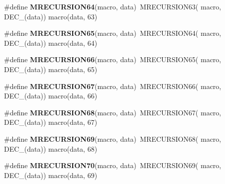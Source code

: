 \begin{DoxyCompactItemize}
\item 
\hypertarget{group__group__sam0__utils__mrecursion_gada0aad0d480e150d9fd5621e3769f397}{}\#define {\bfseries M\+R\+E\+C\+U\+R\+S\+I\+O\+N64}(macro,  data)~M\+R\+E\+C\+U\+R\+S\+I\+O\+N63(  macro, D\+E\+C\+\_\+(data))   macro(data, 63)\label{group__group__sam0__utils__mrecursion_gada0aad0d480e150d9fd5621e3769f397}

\item 
\hypertarget{group__group__sam0__utils__mrecursion_ga559cd98b41f57003d86b982477bad6bb}{}\#define {\bfseries M\+R\+E\+C\+U\+R\+S\+I\+O\+N65}(macro,  data)~M\+R\+E\+C\+U\+R\+S\+I\+O\+N64(  macro, D\+E\+C\+\_\+(data))   macro(data, 64)\label{group__group__sam0__utils__mrecursion_ga559cd98b41f57003d86b982477bad6bb}

\item 
\hypertarget{group__group__sam0__utils__mrecursion_gae1bc9072af8c0a3690822abcf9100937}{}\#define {\bfseries M\+R\+E\+C\+U\+R\+S\+I\+O\+N66}(macro,  data)~M\+R\+E\+C\+U\+R\+S\+I\+O\+N65(  macro, D\+E\+C\+\_\+(data))   macro(data, 65)\label{group__group__sam0__utils__mrecursion_gae1bc9072af8c0a3690822abcf9100937}

\item 
\hypertarget{group__group__sam0__utils__mrecursion_ga82481335ba51960ceed696d568754f3d}{}\#define {\bfseries M\+R\+E\+C\+U\+R\+S\+I\+O\+N67}(macro,  data)~M\+R\+E\+C\+U\+R\+S\+I\+O\+N66(  macro, D\+E\+C\+\_\+(data))   macro(data, 66)\label{group__group__sam0__utils__mrecursion_ga82481335ba51960ceed696d568754f3d}

\item 
\hypertarget{group__group__sam0__utils__mrecursion_gaa350567fcc5f153cda9d1cfcff214a99}{}\#define {\bfseries M\+R\+E\+C\+U\+R\+S\+I\+O\+N68}(macro,  data)~M\+R\+E\+C\+U\+R\+S\+I\+O\+N67(  macro, D\+E\+C\+\_\+(data))   macro(data, 67)\label{group__group__sam0__utils__mrecursion_gaa350567fcc5f153cda9d1cfcff214a99}

\item 
\hypertarget{group__group__sam0__utils__mrecursion_ga0298145e1a282f5e0264927f7d41f8d3}{}\#define {\bfseries M\+R\+E\+C\+U\+R\+S\+I\+O\+N69}(macro,  data)~M\+R\+E\+C\+U\+R\+S\+I\+O\+N68(  macro, D\+E\+C\+\_\+(data))   macro(data, 68)\label{group__group__sam0__utils__mrecursion_ga0298145e1a282f5e0264927f7d41f8d3}

\item 
\hypertarget{group__group__sam0__utils__mrecursion_gaf4c046319eba8a2f6684263fb690ad64}{}\#define {\bfseries M\+R\+E\+C\+U\+R\+S\+I\+O\+N70}(macro,  data)~M\+R\+E\+C\+U\+R\+S\+I\+O\+N69(  macro, D\+E\+C\+\_\+(data))   macro(data, 69)\label{group__group__sam0__utils__mrecursion_gaf4c046319eba8a2f6684263fb690ad64}


\end{DoxyCompactItemize}
